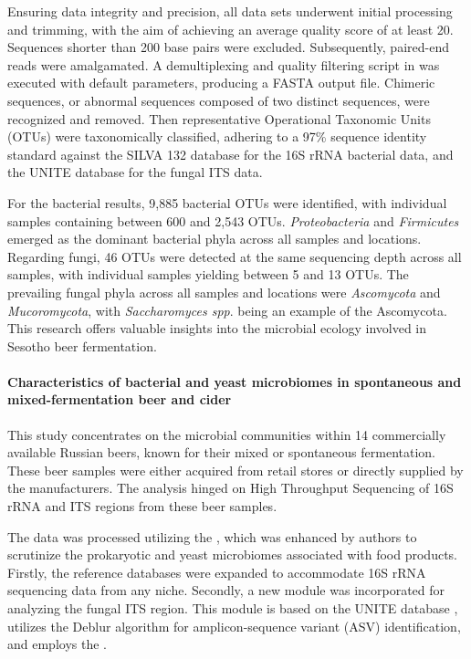                 Ensuring data integrity and precision, all data sets underwent initial processing and trimming, with the aim of achieving an average quality score of at least 20. Sequences shorter than 200 base pairs were excluded. Subsequently, paired-end reads were amalgamated. A demultiplexing and quality filtering script in  was executed with default parameters, producing a FASTA output file. Chimeric sequences, or abnormal sequences composed of two distinct sequences, were recognized and removed. Then representative Operational Taxonomic Units (OTUs) were taxonomically classified, adhering to a 97\% sequence identity standard against the SILVA 132 database for the 16S rRNA bacterial data, and the UNITE database for the fungal ITS data.
                
                For the bacterial results, 9,885 bacterial OTUs were identified, with individual samples containing between 600 and 2,543 OTUs. \textit{Proteobacteria} and \textit{Firmicutes} emerged as the dominant bacterial phyla across all samples and locations. Regarding fungi, 46 OTUs were detected at the same sequencing depth across all samples, with individual samples yielding between 5 and 13 OTUs. The prevailing fungal phyla across all samples and locations were \textit{Ascomycota} and \textit{Mucoromycota}, with \textit{Saccharomyces spp}. being an example of the Ascomycota. This research offers valuable insights into the microbial ecology involved in Sesotho beer fermentation.
                
            \paragraph*{Characteristics of bacterial and yeast microbiomes in spontaneous and mixed-fermentation beer and cider}
                This study concentrates on the microbial communities within 14 commercially available Russian beers, known for their mixed or spontaneous fermentation. These beer samples were either acquired from retail stores or directly supplied by the manufacturers. The analysis hinged on High Throughput Sequencing of 16S rRNA and ITS regions from these beer samples.

                The data was processed utilizing the , which was enhanced by authors to scrutinize the prokaryotic and yeast microbiomes associated with food products. Firstly, the reference databases were expanded to accommodate 16S rRNA sequencing data from any niche. Secondly, a new module was incorporated for analyzing the fungal ITS region. This module is based on the UNITE database \cite{nilsson2019unite}, utilizes the Deblur algorithm \cite{amir2017deblur} for amplicon-sequence variant (ASV) identification, and employs the .
                
